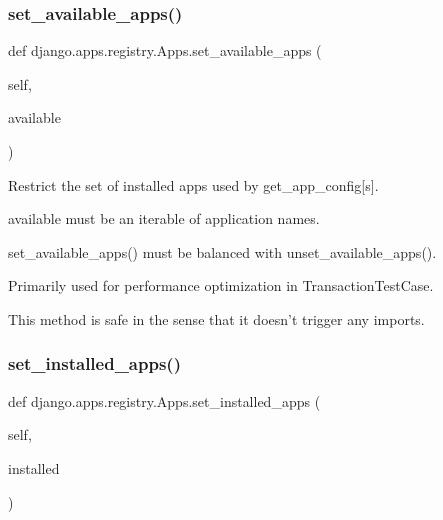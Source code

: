 \subsubsection{\texorpdfstring{set\+\_\+available\+\_\+apps()}{set\_available\_apps()}}
{\footnotesize\ttfamily def django.\+apps.\+registry.\+Apps.\+set\+\_\+available\+\_\+apps (\begin{DoxyParamCaption}\item[{}]{self,  }\item[{}]{available }\end{DoxyParamCaption})}

\begin{DoxyVerb}Restrict the set of installed apps used by get_app_config[s].

available must be an iterable of application names.

set_available_apps() must be balanced with unset_available_apps().

Primarily used for performance optimization in TransactionTestCase.

This method is safe in the sense that it doesn't trigger any imports.
\end{DoxyVerb}
 \mbox{\label{classdjango_1_1apps_1_1registry_1_1_apps_a8ae4c1eb0ea6e28b02d81c56248d3fd5}} 
\subsubsection{\texorpdfstring{set\+\_\+installed\+\_\+apps()}{set\_installed\_apps()}}
{\footnotesize\ttfamily def django.\+apps.\+registry.\+Apps.\+set\+\_\+installed\+\_\+apps (\begin{DoxyParamCaption}\item[{}]{self,  }\item[{}]{installed }\end{DoxyParamCaption})}

